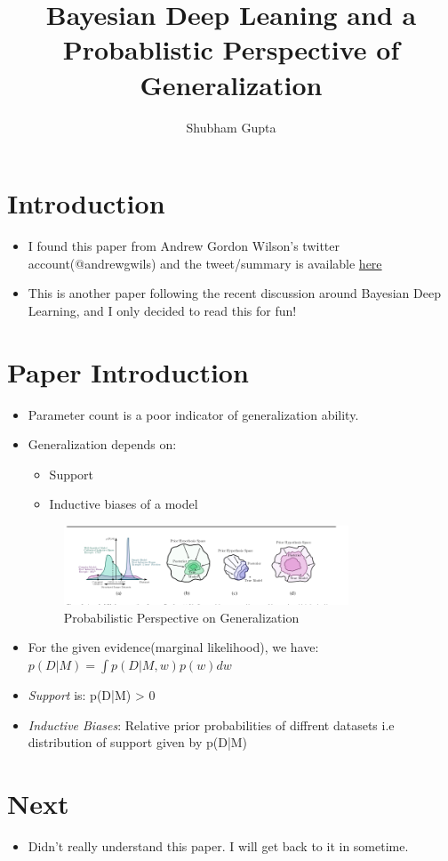 \documentclass[a4paper]{article}
\title{Bayesian Deep Leaning and a Probablistic Perspective of Generalization}
\author{Shubham Gupta}
\begin{document}
\maketitle
\section{Introduction}
\begin{itemize}
    \item I found this paper from Andrew Gordon Wilson's twitter account(@andrewgwils) and the tweet/summary is available \href{https://twitter.com/andrewgwils/status/1230669857840123906}{here}
    \item This is another paper following the recent discussion around Bayesian Deep Learning, and I only decided to read this for fun!
\end{itemize}
\section{Paper Introduction}
\begin{itemize}
    \item Parameter count is a poor indicator of generalization ability.
    \item Generalization depends on:
    \begin{itemize}
        \item Support
        \item Inductive biases of a model
    \end{itemize}
    \begin{figure}[H]
        \centering
        \includegraphics[width=0.8\textwidth]{prob_perspective}
        \caption{Probabilistic Perspective on Generalization}
        \label{fig:prob_perspective}
    \end{figure}
    \item For the given evidence(marginal likelihood), we have: $p(D|M) = \int p(D|M, w)p(w)dw$
    \item \textit{Support} is: p(D|M) > 0
    \item \textit{Inductive Biases}: Relative prior probabilities of diffrent datasets i.e distribution of support given by p(D|M)
\end{itemize}
\section{Next}
\begin{itemize}
    \item Didn't really understand this paper. I will get back to it in sometime.
\end{itemize}
\end{document}
